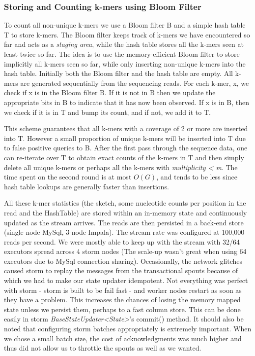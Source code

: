 \documentclass[11pt]{article}
\begin{document}
\subsubsection{Storing and Counting k-mers using Bloom Filter}
To count all non-unique k-mers we use a Bloom filter B and a simple hash table T to store k-mers. The Bloom filter keeps track of k-mers we have encountered so far and acts as a \emph{staging area}, while the hash table stores all the k-mers seen at least twice so far. The idea is to use the memory-efficient Bloom filter to store implicitly all k-mers seen so far, while only inserting non-unique k-mers into the hash table. Initially both the Bloom filter and the hash table are empty. All k-mers are generated sequentially from the sequencing reads. For each k-mer, x, we check if x is in the Bloom filter B. If it is not in B then we update the appropriate bits in B to indicate that it has now been observed. If x is in B, then we check if it is in T and bump its count, and if not, we add it to T.

This scheme guarantees that all k-mers with a coverage of 2 or more are inserted into T. However a small proportion of unique k-mers will be inserted into T due to false positive queries to B. After the first pass through the sequence data, one can re-iterate over T to obtain exact counts of the k-mers in T and then simply delete all unique k-mers or perhaps all the k-mers with \emph{multiplicity < m}. The time spent on the second round is at most $O(G)$, and tends to be less since hash table lookups are generally faster than insertions.

All these k-mer statistics (the sketch, some nucleotide counts per position in the read and the HashTable) are stored within an in-memory state and continuously updated as the stream arrives. The reads are then persisted in a back-end store (single node MySql, 3-node Impala). The stream rate was configured at 100,000 reads per second. We were mostly able to keep up with the stream with 32/64 executors spread across 4 storm nodes (The scale-up wasn't great when using 64 executors due to MySql connection sharing). Occasionally, the network glitches caused storm to replay the messages from the transactional spouts because of which we had to make our state updater idempotent. Not everything was perfect with storm - storm is built to be fail fast - and worker nodes restart as soon as they have a problem. This increases the chances of losing the memory mapped state unless we persist them, perhaps to a fast column store. This can be done easily in storm \emph{BaseStateUpdater<State>}'s commit() method. It should also be noted that configuring storm batches appropriately is extremely important. When we chose a small batch size, the cost of acknowledgments was much higher and thus did not allow us to throttle the spouts as well as we wanted.
\end{document}

